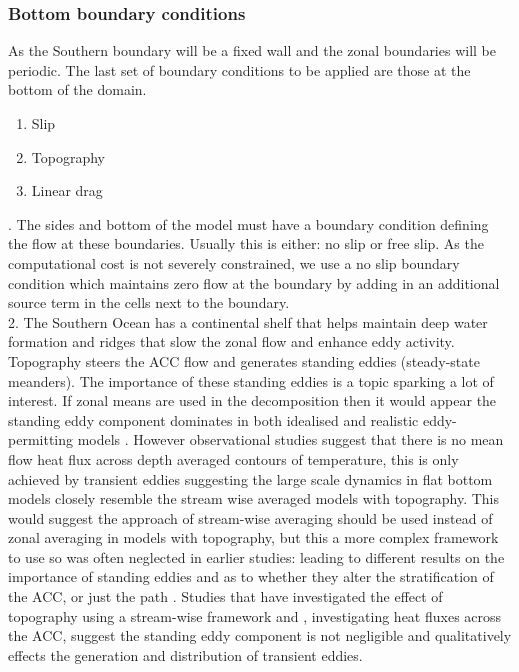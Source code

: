 \subsubsection*{Bottom boundary conditions}
\label{sec:BBC}
As the Southern boundary will be a fixed wall and the zonal boundaries will be periodic. The last set of boundary conditions to be applied are those at the bottom of the domain.
\singlespacing
\begin{enumerate}
\item Slip
\item Topography
\item Linear drag
\end{enumerate}

. The sides and bottom of the model must have a boundary condition defining the flow at these boundaries. Usually this is either: no slip or free slip. As the computational cost is not severely constrained, we use a no slip boundary condition which maintains zero flow at the boundary by adding in an additional source term in the cells next to the boundary.\\  
2. The Southern Ocean has a continental shelf that helps maintain deep water formation and ridges that slow the zonal flow and enhance eddy activity.  Topography steers the ACC flow and generates standing eddies (steady-state meanders). The importance of these standing eddies is a topic sparking a lot of interest. If zonal means are used in the decomposition then it would appear the standing eddy component dominates in
both idealised and realistic eddy-permitting models \cite{treguier2007}. However observational studies \cite{szoeke1981} suggest that there is no mean flow heat flux across depth averaged contours of temperature, this is only achieved by transient eddies suggesting the large scale dynamics in flat bottom models closely resemble the stream wise averaged models with topography. This would suggest the approach of stream-wise averaging should be used instead of zonal averaging in models with topography, but this a more complex framework to use so was often neglected in earlier studies: \cite{hallberg2006,farneti2010} leading to different results on the importance of standing eddies and as to whether they alter the stratification of the ACC, or just the path \cite{abernathey2013}. Studies that have investigated the effect of topography using a stream-wise framework \cite{viebahn2012} and \citep{abernathey2013}, investigating heat fluxes across the ACC, suggest the standing eddy component is not negligible and qualitatively effects the generation and distribution of transient eddies. 
